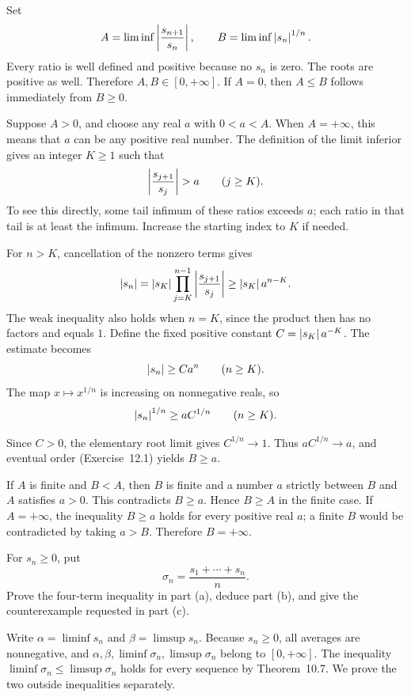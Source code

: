 Set
\[
 A=\liminf\left|\frac{s_{n+1}}{s_n}\right|,\qquad
 B=\liminf\left|s_n\right|^{1/n}.
\]
Every ratio is well defined and positive because no $s_n$ is zero.
The roots are positive as well. Therefore $A,B\in[0,+\infty]$.
If $A=0$, then $A\le B$ follows immediately from $B\ge0$.

Suppose $A>0$, and choose any real $a$ with $0<a<A$. When
$A=+\infty$, this means that $a$ can be any positive real number.
The definition of the limit inferior gives an integer $K\ge1$
such that
\[
 \abs{\frac{s_{j+1}}{s_j}}>a\qquad(j\ge K).
\]
To see this directly, some tail infimum of these ratios exceeds $a$;
each ratio in that tail is at least the infimum. Increase the starting
index to $K$ if needed.

For $n>K$, cancellation of the nonzero terms gives
\[
 \left|s_n\right|
 =\left|s_K\right|\prod_{j=K}^{n-1}\left|\frac{s_{j+1}}{s_j}\right|
 \ge \left|s_K\right|a^{n-K}.
\]
The weak inequality also holds when $n=K$, since the product then
has no factors and equals $1$. Define the fixed positive constant
$C=\left|s_K\right|a^{-K}$. The estimate becomes
\[
 \left|s_n\right|\ge Ca^n\qquad(n\ge K).
\]
The map $x\mapsto x^{1/n}$ is increasing on nonnegative reals, so
\[
 \left|s_n\right|^{1/n}\ge aC^{1/n}\qquad(n\ge K).
\]

Since $C>0$, the elementary root limit gives $C^{1/n}\to1$.
Thus $aC^{1/n}\to a$, and eventual order (Exercise~12.1) yields
$B\ge a$.

If $A$ is finite and $B<A$, then $B$ is finite and a number
$a$ strictly between $B$ and $A$ satisfies $a>0$. This contradicts
$B\ge a$. Hence $B\ge A$ in the finite case. If $A=+\infty$,
the inequality $B\ge a$ holds for every positive real $a$; a finite
$B$ would be contradicted by taking $a>B$. Therefore $B=+\infty$.

\goal For $s_n\ge0$, put
\[
 \sigma_n=\frac{s_1+\cdots+s_n}{n}.
\]
Prove the four-term inequality in part (a), deduce part (b), and give
the counterexample requested in part (c).

Write $\alpha=\liminf s_n$ and $\beta=\limsup s_n$.
Because $s_n\ge0$, all averages are nonnegative, and
$\alpha,\beta,\liminf\sigma_n,\limsup\sigma_n$ belong to
$[0,+\infty]$. The inequality
$\liminf\sigma_n\le\limsup\sigma_n$ holds for every sequence
by Theorem~10.7. We prove the two outside inequalities separately.

